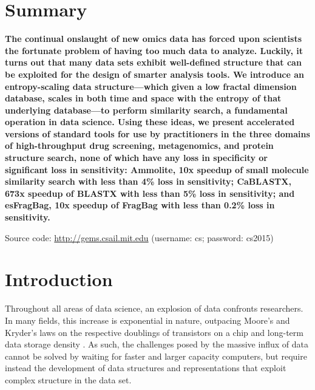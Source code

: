 \documentclass[review,preprint,12pt]{elsarticle}
\renewcommand{\cite}{\citep} %
\theoremstyle{definition}
\theoremstyle{remark}
\numberwithin{equation}{section}
\begin{document}
\section{Summary}
{ \bfseries
    The continual onslaught of new omics data has forced upon scientists the fortunate problem of having too much data to analyze.
    Luckily, it turns out that many data sets exhibit well-defined structure that can be exploited for the design of 
smarter analysis tools.
    We introduce an entropy-scaling data structure---which given a low fractal dimension database, scales in both time and space with the entropy of that underlying database---to perform similarity search, a fundamental operation in data science.
    Using these ideas, we present accelerated versions of standard tools for use by practitioners in the three domains of high-throughput drug screening, metagenomics, and protein structure search, none of which have any loss in specificity or significant loss in sensitivity:
    Ammolite, 10x speedup of small molecule similarity search with less than 4\% loss in sensitivity; CaBLASTX, 673x speedup of BLASTX with less than 5\% loss in sensitivity; and esFragBag, 10x speedup of FragBag with less than 0.2\% loss in sensitivity.

    Source code: \url{http://gems.csail.mit.edu} (username: cs; password: cs2015)
}

\section{Introduction}
Throughout all areas of data science, an explosion of data confronts 
researchers.
In many fields, this increase is exponential in nature, outpacing Moore's and Kryder's laws on the respective doublings of transistors on a chip and long-term data storage density \cite{kahn2011future}.
As such, the challenges posed by the massive influx of data cannot be solved by waiting for faster and larger capacity computers, but require instead the development of data structures and representations that exploit complex
structure in the data set.
\end{document}
